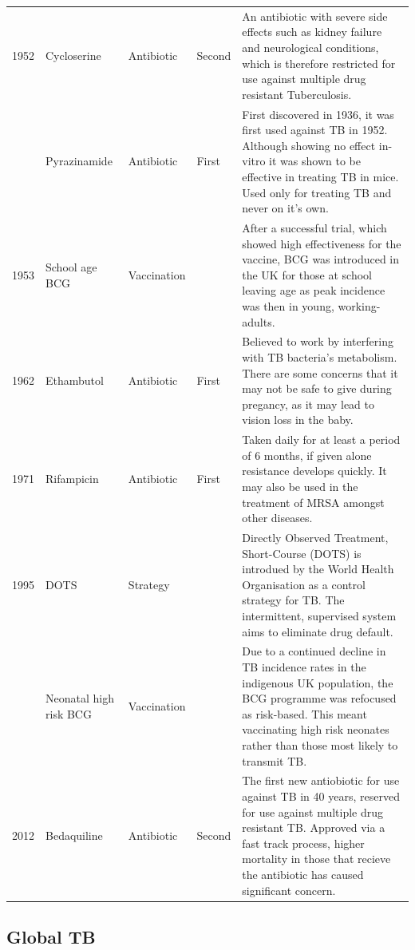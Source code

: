 \documentclass[11pt,twoside]{bristolthesis}
\begin{document}
\begin{landscape}
\begin{longtable}{rlll>{\raggedright\arraybackslash}p{10cm}}
  1952 & Cycloserine & Antibiotic & Second & An antibiotic with severe side effects such as kidney failure and neurological conditions, which is therefore restricted for use against multiple
                                               drug resistant Tuberculosis.\\
  \addlinespace
  1952 & Pyrazinamide & Antibiotic & First & First discovered in 1936, it was first used against TB in 1952. Although showing no effect in-vitro it was shown to be effective in treating TB in mice.
                                               Used only for treating TB and never on it's own.\\
  1953 & School age BCG & Vaccination &  & After a successful trial, which showed high effectiveness
                                               for the vaccine, BCG was introduced in the UK for those at school leaving age
                                               as peak incidence was then in young, working-adults.\\
  1962 & Ethambutol & Antibiotic & First & Believed to work by interfering with TB bacteria's metabolism. There are some concerns that it may not be safe to give during pregancy,
                                               as it may lead to vision loss in the baby.\\
  1971 & Rifampicin & Antibiotic & First & Taken daily for at least a period of 6 months, if given alone resistance develops quickly. It may also be used in the treatment
                                               of MRSA amongst other diseases.\\
  1995 & DOTS & Strategy &  & Directly Observed Treatment, Short-Course (DOTS) is introdued by the World Health Organisation as a control strategy for TB. The intermittent, supervised system
                                               aims to eliminate drug default.\\
  \addlinespace
  2005 & Neonatal high risk BCG & Vaccination &  & Due to a continued decline in TB incidence rates in the indigenous UK population, the BCG 
                                               programme was refocused as risk-based. This meant vaccinating high risk neonates rather than those 
                                               most likely to transmit TB.\\
  2012 & Bedaquiline & Antibiotic & Second & The first new antiobiotic for use against TB in 40 years, reserved for use against multiple drug resistant TB. Approved via a fast track process, higher mortality in those that recieve the antibiotic has caused
                                               significant concern.\\*
  \end{longtable}
  \endgroup{}
  \end{landscape}
  \hypertarget{global-tb}{%
  \subsection{Global TB}\label{global-tb}}
  
\end{document}
